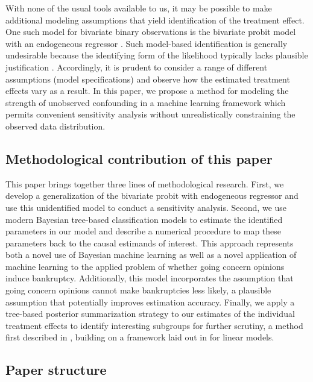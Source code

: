 \documentclass[aoas,preprint, 11pt, dvipsnames, table, x11name]{imsart}
\theoremstyle{remark}
\begin{document}
	With none of the usual tools available to us, it may be possible to make additional modeling assumptions that yield identification of the treatment effect. One such model for bivariate binary observations is the bivariate probit model with an endogeneous regressor \citep[Section~ 15.7.3]{Wooldridge-2010}. Such model-based identification is generally undesirable because the identifying form of the likelihood typically lacks plausible justification \citep{Manski}. Accordingly, it is prudent to consider a range of different assumptions (model specifications) and observe how the estimated treatment effects vary as a result. In this paper, we propose a method for modeling the strength of unobserved confounding in a machine learning framework which permits convenient sensitivity analysis without unrealistically constraining the observed data distribution.
	
	\subsection{Methodological contribution of this paper}
	
	This paper brings together three lines of methodological research. First, we develop a generalization of the bivariate probit with endogeneous regressor and use this unidentified model to conduct a sensitivity analysis. Second, we use modern Bayesian tree-based classification models to estimate the identified parameters in our model and describe a numerical procedure to map these parameters back to the causal estimands of interest. This approach represents both a novel use of Bayesian machine learning as well as a novel application of machine learning to the applied problem of whether going concern opinions induce bankruptcy. Additionally, this model incorporates the assumption that going concern opinions cannot make bankruptcies less likely, a plausible assumption that potentially improves estimation accuracy. Finally, we apply a tree-based posterior summarization strategy to our estimates of the individual treatment effects to identify interesting subgroups for further scrutiny, a method first described in \cite{bcf}, building on a framework laid out in \cite{Hahn-2015} for linear models.
	
	\subsection{Paper structure}
	
\end{document}
